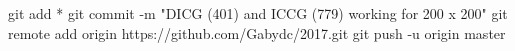git add *
git commit -m "DICG (401) and ICCG (779) working for 200 x 200"
git remote add origin https://github.com/Gabydc/2017.git
git push -u origin master
